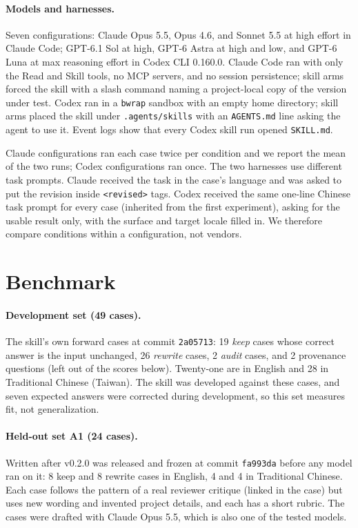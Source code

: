 \documentclass[11pt]{article}
\newcommand{\code}[1]{\texttt{#1}}
\begin{document}
\paragraph{Models and harnesses.} Seven configurations: Claude Opus 5.5, Opus 4.6, and
Sonnet 5.5 at high effort in Claude Code; GPT-6.1 Sol at high, GPT-6 Astra at high and
low, and GPT-6 Luna at max reasoning effort in Codex CLI 0.160.0. Claude Code ran with
only the Read and Skill tools, no MCP servers, and no session persistence; skill arms
forced the skill with a slash command naming a project-local copy of the version under
test. Codex ran in a \code{bwrap} sandbox with an empty home directory; skill arms placed
the skill under \code{.agents/skills} with an \code{AGENTS.md} line asking the agent to
use it. Event logs show that every Codex skill run opened \code{SKILL.md}.

Claude configurations ran each case twice per condition and we report the mean of the two
runs; Codex configurations ran once. The two harnesses use different task prompts. Claude
received the task in the case's language and was asked to put the revision inside
\code{<revised>} tags. Codex received the same one-line Chinese task prompt for every case
(inherited from the first experiment), asking for the usable result only, with the
surface and target locale filled in. We therefore compare conditions within a
configuration, not vendors.

\section{Benchmark}
\label{sec:data}

\paragraph{Development set (49 cases).} The skill's own forward cases at commit
\code{2a05713}: 19 \emph{keep} cases whose correct answer is the input unchanged, 26
\emph{rewrite} cases, 2 \emph{audit} cases, and 2 provenance questions (left out of the
scores below). Twenty-one are in English and 28 in Traditional Chinese (Taiwan). The
skill was developed against these cases, and seven expected answers were corrected during
development, so this set measures fit, not generalization.

\paragraph{Held-out set A1 (24 cases).} Written after v0.2.0 was released and frozen at
commit \code{fa993da} before any model ran on it: 8 keep and 8 rewrite cases in English, 4
and 4 in Traditional Chinese. Each case follows the pattern of a real reviewer critique
(linked in the case) but uses new wording and invented project details, and each has a
short rubric. The cases were drafted with Claude Opus 5.5, which is also one of the tested
models.
\end{document}

